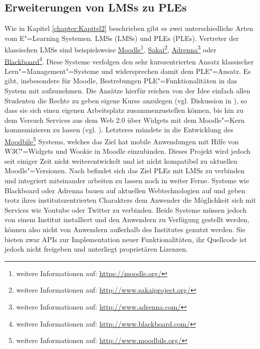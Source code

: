 \subsection{Erweiterungen von \acp{LMS} zu \acp{PLE}}
Wie in Kapitel \ref{chapter:Kapitel2} beschrieben gibt es zwei unterschiedliche Arten vom E"=Learning Systemen. \aclp{LMS} (\acp{LMS}) und \aclp{PLE} (\acp{PLE}). Vertreter der klassischen \acp{LMS} sind beispielsweise \href{https://moodle.org/}{Moodle}\footnote{weitere Informationen auf: \url{https://moodle.org/}}, \href{http://www.sakaiproject.org/}{Sakai}\footnote{weitere Informationen auf: \url{http://www.sakaiproject.org/}}, \href{http://www.adrenna.com/}{Adrenna}\footnote{weitere Informationen auf: \url{http://www.adrenna.com/}} oder \href{http://www.blackboard.com/}{Blackboard}\footnote{weitere Informationen auf: \url{http://www.blackboard.com/}}. Diese Systeme verfolgen den sehr kurszentrierten Ansatz klassischer Lern"=Management"=Systeme und widersprechen damit dem \ac{PLE}"=Ansatz. Es gibt, insbesondere für Moodle, Bestrebungen \ac{PLE}"=Funktionalitäten in das System mit aufzunehmen. Die Ansätze hierfür reichen von der Idee einfach allen Studenten die Rechte zu geben eigene Kurse anzulegen (vgl. Diskussion in \cite{MoodleForum2009}), so dass sie sich einen eigenen Arbeitsplatz zusammenzustellen können, bis hin zu dem Versuch Services aus dem Web 2.0 über Widgets mit dem Moodle"=Kern kommunizieren zu lassen (vgl. \cite{Penalvo2011}). Letzteres mündete in die Entwicklung des \href{http://www.moodbile.org/}{Moodbile}\footnote{weitere Informationen auf: \url{http://www.moodbile.org/}} Systems, welches das Ziel hat mobile Anwendungen mit Hilfe von \ac{W3C}"=Widgets und Wookie in Moodle einzubinden. Dieses Projekt wird jedoch seit einiger Zeit nicht weiterentwickelt und ist nicht kompatibel zu aktuellen Moodle"=Versionen. Nach \cite{Penalvo2011} befindet sich das Ziel \acp{PLE} mit \acp{LMS} zu verbinden und integriert miteinander arbeiten zu lassen noch in weiter Ferne. Systeme wie Blackboard oder Adrenna bauen auf aktuellen Webtechnologien auf und geben trotz ihres institutszentrierten Charakters dem Anwender die Möglichkeit sich mit Services wie Youtube oder Twitter zu verbinden. Beide Systeme müssen jedoch von einem Institut installiert und den Anwendern zu Verfügung gestellt werden, können also nicht von Anwendern außerhalb des Institutes genutzt werden. Sie bieten zwar \acp{API} zur Implementation neuer Funktionalitäten, ihr Quellcode ist jedoch nicht freigeben und unterliegt proprietären Lizenzen.

